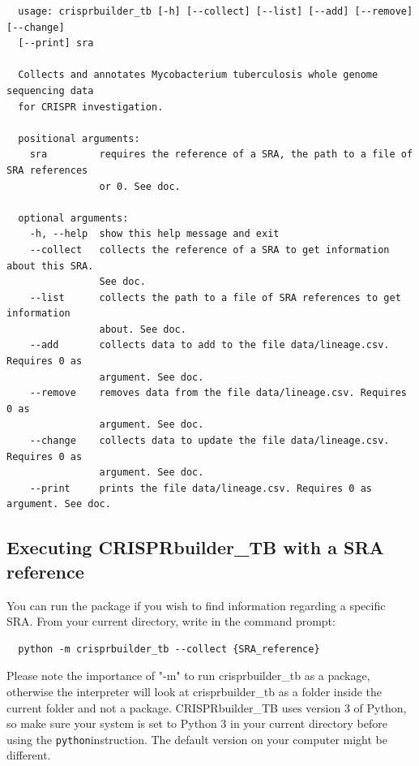 \documentclass[twoside,a4paper,11pt,frenchb,openany]{report}
\begin{document}
    \begin{verbatim}
  usage: crisprbuilder_tb [-h] [--collect] [--list] [--add] [--remove] [--change]
  [--print] sra

  Collects and annotates Mycobacterium tuberculosis whole genome sequencing data
  for CRISPR investigation.

  positional arguments:
    sra         requires the reference of a SRA, the path to a file of SRA references
                or 0. See doc.

  optional arguments:
    -h, --help  show this help message and exit
    --collect   collects the reference of a SRA to get information about this SRA. 
                See doc.
    --list      collects the path to a file of SRA references to get information 
                about. See doc.
    --add       collects data to add to the file data/lineage.csv. Requires 0 as 
                argument. See doc.
    --remove    removes data from the file data/lineage.csv. Requires 0 as 
                argument. See doc.
    --change    collects data to update the file data/lineage.csv. Requires 0 as
                argument. See doc.
    --print     prints the file data/lineage.csv. Requires 0 as argument. See doc.
\end{verbatim}



    \subsection{Executing CRISPRbuilder\_TB with a SRA
reference}\label{executing-crisprbuilder_tb-with-a-sra-reference}

    You can run the package if you wish to find information regarding a
specific SRA. From your current directory, write in the command prompt:

    \begin{verbatim}
  python -m crisprbuilder_tb --collect {SRA_reference}
\end{verbatim}

    Please note the importance of "-m" to run crisprbuilder\_tb as a
package, otherwise the interpreter will look at crisprbuilder\_tb as a folder inside the current folder and not a package. CRISPRbuilder\_TB uses version 3 of Python, so make sure your system is set to Python 3 in your current directory before using the
\texttt{python}instruction. The default version on your computer might
be different.
\end{document}
